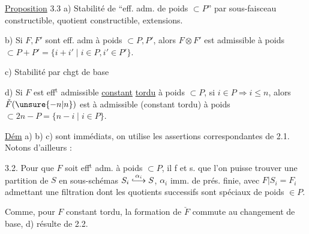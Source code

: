 
\uline{Proposition} 3.3 \quad a) Stabilité de \textquotedblleft eff. adm. de poids $\subset P$\textquotedblright{} par sous-faisceau constructible, quotient constructible,  extensions.

b) Si $F,F'$ sont eff. adm à poids $\subset P,P'$, alors $F\otimes F'$ est admissible à poids $\subset P+P'=\{i+i'\mid i\in P,i'\in P'\}$.

c) Stabilité par chgt de base

d) Si $F$ est  eff$^{\mathrm t}$ admissible \uline{constant} \uline{tordu} à poids $\subset P$,  si $i\in P\Rightarrow i\le n$, alors $\check F(\unsure{-n|n})$ est à  admissible (constant tordu) à poids $\subset 2n-P=\{n-i\mid i\in P\}$.

\uline{Dém} \quad a) b) c) sont immédiats, on utilise les assertions correspondantes de 2.1. Notons d'ailleurs :

3.2.  Pour que $F$ soit eff$^{\mathrm t}$ adm. à poids $\subset P$, il f et s. que l'on puisse trouver une partition de $S$ en  sous-schémas $S_i\overset{\alpha_i}{\lhook\joinrel\longrightarrow} S$, $\alpha_i$ imm. de prés. finie, avec  $F|S_i=F_i$ admettant une filtration dont les quotients successifs sont spéciaux de poids $\in P$.

Comme, pour $F$ constant tordu, la formation de $\check F$ commute au changement de base,  d) résulte de 2.2.

